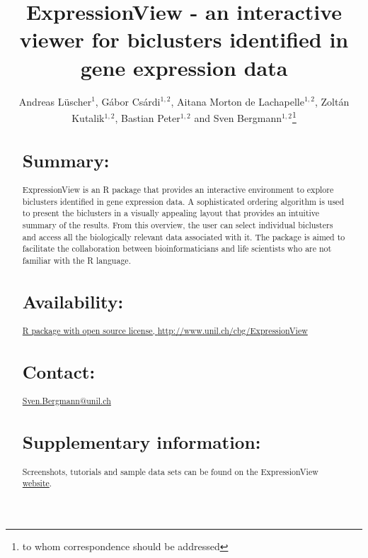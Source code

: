\documentclass[round]{bioinfo}
\begin{document}
\application{}
\title[ExpressionView]{ExpressionView - an interactive viewer for biclusters identified in gene expression data}
\author[Andreas L\"uscher, G\'abor Cs\'ardi, Aitana Morton de Lachapelle, Zolt\'an Kutalik, and Sven Bergmann]{Andreas L\"uscher$^1$, G\'abor Cs\'ardi$^{1,2}$, Aitana Morton de Lachapelle$^{1,2}$, Zolt\'an Kutalik$^{1,2}$, Bastian Peter$^{1,2}$ and Sven Bergmann$^{1,2}$\footnote{to whom correspondence should be addressed}}
\address{
	$^{1}$Swiss Institute of Bioinformatics, Lausanne, Switzerland\\
	$^{2}$Department of Medical Genetics, University of Lausanne, Lausanne, Switzerland
}



\maketitle

\begin{abstract}

\section{Summary:}
ExpressionView is an R package that provides an interactive environment to explore biclusters identified in gene expression data. A sophisticated ordering algorithm is used to present the biclusters in a visually appealing layout that provides an intuitive summary of the results. From this overview, the user can select individual biclusters and access all the biologically relevant data associated with it. The package is aimed to facilitate the collaboration between bioinformaticians and life scientists who are not familiar with the R language.

\section{Availability:} 
\href{http://www.unil.ch/cbg/ExpressionView}{R
  package with open source license, \url{http://www.unil.ch/cbg/ExpressionView}}

\section{Contact:} \href{Sven.Bergmann@unil.ch}{Sven.Bergmann@unil.ch}

\section{Supplementary information:}
Screenshots, tutorials and sample data sets can be found on the ExpressionView \href{http://www.unil.ch/cbg/ExpressionView}{website}.

\end{abstract}
\end{document}
